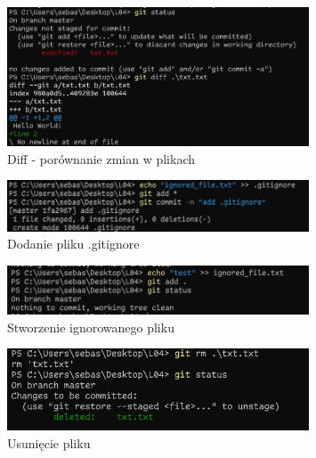 \documentclass{article} %
\begin{document}
\begin{figure}[h]
	\centering
	\includegraphics[width=0.8\textwidth]{image/git/6.png}
	\caption{Diff - porównanie zmian w plikach}
\end{figure}

\begin{figure}[h]
	\centering
	\includegraphics[width=0.8\textwidth]{image/git/7.png}
	\caption{Dodanie pliku .gitignore}
\end{figure}

\begin{figure}[h]
	\centering
	\includegraphics[width=0.8\textwidth]{image/git/8.png}
	\caption{Stworzenie ignorowanego pliku}
\end{figure}

\begin{figure}[h]
	\centering
	\includegraphics[width=0.8\textwidth]{image/git/9.png}
	\caption{Usunięcie pliku}
\end{figure}
\end{document}
